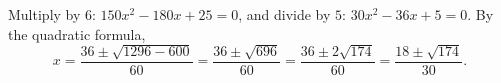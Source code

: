 Multiply by $6$: $150x^2-180x+25=0$, and divide by $5$: $30x^2-36x+5=0$. By the quadratic formula,
\[x=\dfrac{36\pm\sqrt{1296-600}}{60}=\dfrac{36\pm\sqrt{696}}{60}=\dfrac{36\pm2\sqrt{174}}{60}=\boxed{\dfrac{18\pm\sqrt{174}}{30}}.\]
